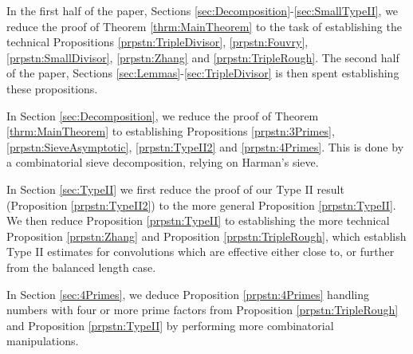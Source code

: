 \documentclass[10pt]{amsart}
\theoremstyle{plain}
\numberwithin{equation}{section}
\begin{document}
\begin{center}
{{\begin{center}
\end{center}}}
   \end{center}
%
%
%
In the first half of the paper, Sections \ref{sec:Decomposition}-\ref{sec:SmallTypeII}, we reduce the proof of Theorem \ref{thrm:MainTheorem} to the task of establishing the technical Propositions \ref{prpstn:TripleDivisor}, \ref{prpstn:Fouvry}, \ref{prpstn:SmallDivisor}, \ref{prpstn:Zhang} and \ref{prpstn:TripleRough}. The second half of the paper, Sections \ref{sec:Lemmas}-\ref{sec:TripleDivisor} is then spent establishing these propositions.

In Section \ref{sec:Decomposition}, we reduce the proof of Theorem \ref{thrm:MainTheorem} to establishing Propositions \ref{prpstn:3Primes}, \ref{prpstn:SieveAsymptotic}, \ref{prpstn:TypeII2} and \ref{prpstn:4Primes}. This is done by a combinatorial sieve decomposition, relying on Harman's sieve.

In Section \ref{sec:TypeII} we first reduce the proof of our Type II result (Proposition \ref{prpstn:TypeII2}) to the more general Proposition \ref{prpstn:TypeII}. We then reduce Proposition \ref{prpstn:TypeII} to establishing the more technical Proposition \ref{prpstn:Zhang} and Proposition \ref{prpstn:TripleRough}, which establish Type II estimates for convolutions which are effective either close to, or further from the balanced length case.

In Section \ref{sec:4Primes}, we deduce Proposition \ref{prpstn:4Primes} handling numbers with four or more prime factors from Proposition \ref{prpstn:TripleRough} and Proposition \ref{prpstn:TypeII} by performing more combinatorial manipulations.
\end{document}
